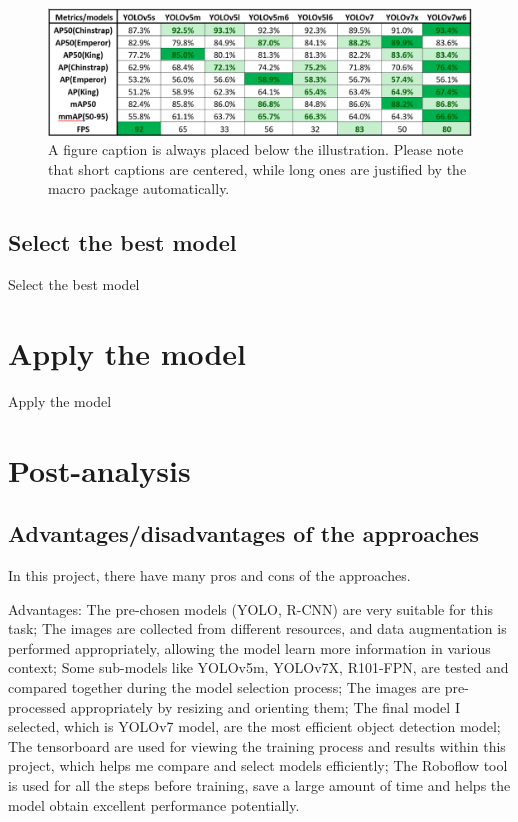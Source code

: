 \documentclass[runningheads]{llncs}
\begin{document}
\begin{figure}
\includegraphics[width=\textwidth]{result.eps}
\caption{A figure caption is always placed below the illustration.
Please note that short captions are centered, while long ones are
justified by the macro package automatically.} \label{fig1}
\end{figure}

\subsection{Select the best model}
Select the best model

\section{Apply the model}
Apply the model

\section{Post-analysis}
\subsection{Advantages/disadvantages of the approaches}
In this project, there have many pros and cons of the approaches.

Advantages: The pre-chosen models (YOLO, R-CNN) are very suitable for this task; The images are collected from different resources, and data augmentation is performed appropriately, allowing the model learn more information in various context; Some sub-models like YOLOv5m, YOLOv7X, R101-FPN, are tested and compared together during the model selection process; The images are pre-processed appropriately by resizing and orienting them; The final model I selected, which is YOLOv7 model, are the most efficient object detection model; The tensorboard are used for viewing the training process and results within this project, which helps me compare and select models efficiently; The Roboflow tool is used for all the steps before training, save a large amount of time and helps the model obtain excellent performance potentially. 
\end{document}
